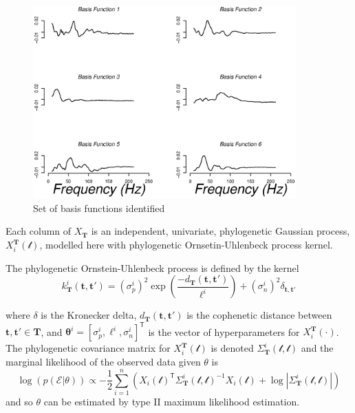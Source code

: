 \documentclass[wsdraft]{ws-rv9x6} %
\begin{document}
\begin{figure}[h]
	\centering
	\includegraphics[width = 0.9\textwidth]{../Figures/basis.eps}
	\caption{Set of basis functions identified}
\end{figure}

Each column of \(X_{\mathbf{T}}\) is an independent, univariate, phylogenetic Gaussian process, \(X_i^{\mathbf{T}}(\mathcal{t})\), modelled here with phylogenetic Ornsetin-Uhlenbeck process kernel.

The phylogenetic Ornstein-Uhlenbeck process is defined by the kernel
\begin{equation}
k_{\mathbf{T}}^i(\mathbf{t}, \mathbf{t}') = (\sigma_p^i)^2 \exp \left( \frac{-d_{\mathbf{T}}(\mathbf{t}, \mathbf{t}')}{\ell^i} \right) + (\sigma_n^i)^2 \delta_{\mathbf{t}, \mathbf{t}'}
\label{eqn:oukernel}
\end{equation}

where \(\delta\) is the Kronecker delta, \(d_{\mathbf{T}}(\mathbf{t}, \mathbf{t}')\) is the cophenetic distance between \(\mathbf{t}, \mathbf{t}' \in \mathbf{T}\), and \(\mathbf{\theta}^i = [\sigma_p^i, \ell^i, \sigma_n^i]^{\mathsf{T}}\) is the vector of hyperparameters for \(X_i^{\mathbf{T}}(\cdot)\). The phylogenetic covariance matrix for \(X_i^{\mathbf{T}}(\mathcal{t})\) is denoted \(\Sigma_{\mathbf{T}}^i(\mathcal{t}, \mathcal{t})\) and the marginal likelihood of the observed data given \(\theta\) is
\begin{equation}
\log(p(\mathcal{E} | \theta)) \propto -\frac{1}{2} \sum_{i = 1}^{n} \left( X_i(\mathcal{t})^{\mathsf{T}} \Sigma_{\mathbf{T}}^i(\mathcal{t}, \mathcal{t})^{-1}  X_i(\mathcal{t}) + \log |\Sigma_{\mathbf{T}}^i(\mathcal{t}, \mathcal{t})|    \right)
\label{eqn:t2mle}
\end{equation}
and so \(\theta\) can be estimated by type II maximum likelihood estimation.
\end{document}
